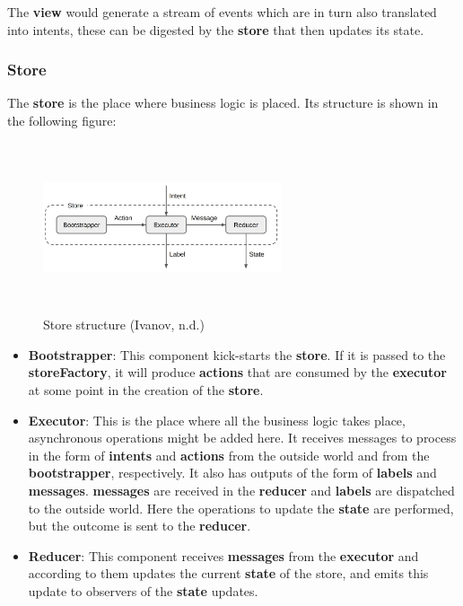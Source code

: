 The \textbf{view} would generate a stream of events which are in turn also translated into intents, these can be digested by the \textbf{store} that then updates its state.

\subsubsection{Store}
The \textbf{store} is the place where business logic is placed. Its structure is shown in the following figure:

\begin{figure}[h]
\centering
\includegraphics[height=5cm,width=7cm]{figures/storeStructure}
\caption{Store structure (Ivanov, n.d.)}
\label{fig: Store structure}
\end{figure}

\begin{itemize}
    \item \textbf{Bootstrapper}: This component kick-starts the \textbf{store}. If it is passed to the \textbf{storeFactory}, it will produce \textbf{actions} that are consumed by the \textbf{executor} at some point in the creation of the \textbf{store}.
   	\item \textbf{Executor}: This is the place where all the business logic takes place, asynchronous operations might be added here. It receives messages to process in the form of \textbf{intents} and \textbf{actions} from the outside world and from the \textbf{bootstrapper}, respectively. It also has outputs of the form of \textbf{labels} and \textbf{messages}. \textbf{messages} are received in the \textbf{reducer} and \textbf{labels} are dispatched to the outside world. Here the operations to update the \textbf{state} are performed, but the outcome is sent to the \textbf{reducer}.
   	\item \textbf{Reducer}: This component receives \textbf{messages} from the \textbf{executor} and according to them updates the current \textbf{state} of the store, and emits this update to observers of the \textbf{state} updates.
\end{itemize}

